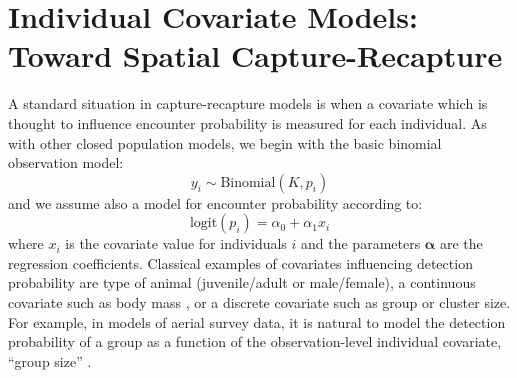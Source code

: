 \section{Individual Covariate Models: Toward Spatial Capture-Recapture}
\label{closed.sec.indcov}


A standard situation in capture-recapture models is when a covariate
which is thought to influence encounter probability is measured for
each individual.  As with other closed population models, we begin
with the basic binomial observation model:
\[
y_{i} \sim \mbox{Binomial}(K, p_{i})
\]
and we assume also  a model for encounter probability according to:
\begin{equation}
 \mbox{logit}(p_{i}) = \alpha_0 + \alpha_1 x_{i}
\label{closed.eq.ha}
\end{equation}
where $x_i$ is the covariate value for individuals $i$ and the
parameters $\bm{\alpha}$ are the regression coefficients. Classical
examples of covariates influencing detection probability are type of
animal (juvenile/adult or male/female), a continuous covariate such as
body mass \citep[][ch. 6]{royle_dorazio:2008}, or a discrete covariate
such as group or cluster size. For example, in models of aerial survey
data, it is natural to model the detection probability of a group as a
function of the observation-level individual covariate, ``group size''
\citep{royle:2008, royle:2009, langtimm_etal:2011}.

